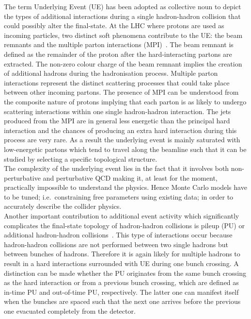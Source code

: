 The term Underlying Event (UE) has been adopted as collective noun to depict the types of additional interactions during a single hadron-hadron collision that could possibly alter the final-state. At the LHC where protons are used as incoming particles, two distinct soft phenomena contribute to the UE: the beam remnants and the multiple parton interactions (MPI)~\cite{Field:2002vt}.
The beam remnant is defined as the remainder of the proton after the hard-interacting partons are extracted. The non-zero colour charge of the beam remnant implies the creation of additional hadrons during the hadronisation process.
Multiple parton interactions represent the distinct scattering processes that could take place between other incoming partons. 
The presence of MPI can be understood from the composite nature of protons implying that each parton is as likely to undergo scattering interactions within one single hadron-hadron interaction.
The jets produced from the MPI  are in general less energetic than the principal hard interaction and the chances of producing an extra hard interaction during this process are very rare.
As a result the underlying event is mainly saturated with low-energetic partons which tend to travel along the beamline such that it can be studied by selecting a specific topological structure.
\\
The complexity of the underlying event lies in the fact that it involves both non-perturbative and perturbative QCD making it, at least for the moment, practically impossible to understand the physics. Hence Monte Carlo models have to be tuned; i.e.\ constraining free parameters using existing data; in order to accurately describe the collider physics.
\\

Another important contribution to additional event activity which significantly complicates the final-state topology of hadron-hadron collisions is pileup (PU) or additional hadron-hadron collisions~\cite{}. This type of interactions occur because hadron-hadron collisions are not performed between two single hadrons but between bunches of hadrons. Therefore it is again likely for multiple hadrons to result in a hard interactions surrounded with UE during one bunch crossing. A distinction can be made whether the PU originates from the same bunch crossing as the hard interaction or from a previous bunch crossing, which are defined as in-time PU and out-of-time PU, respectively. The latter one can manifest itself when the bunches are spaced such that the next one arrives before the previous one evacuated completely from the detector.

